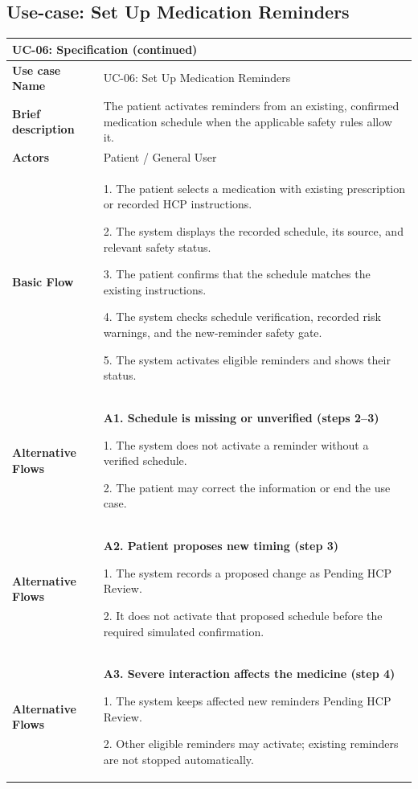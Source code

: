 \subsection{Use-case: Set Up Medication Reminders}
\label{uc:uc-06}
\begin{longtable}{|p{}|p{}|}
\hline
\endfirsthead
\multicolumn{2}{l}{\textbf{UC-06: Specification (continued)}} \\
\hline
\endhead
\textbf{Use case Name} & UC-06: Set Up Medication Reminders \\ \hline
\textbf{Brief description} & The patient activates reminders from an existing, confirmed medication schedule when the applicable safety rules allow it. \\ \hline
\textbf{Actors} & Patient / General User \\ \hline
\textbf{Basic Flow} &
1. The patient selects a medication with existing prescription or recorded HCP instructions.\par
2. The system displays the recorded schedule, its source, and relevant safety status.\par
3. The patient confirms that the schedule matches the existing instructions.\par
4. The system checks schedule verification, recorded risk warnings, and the new-reminder safety gate.\par
5. The system activates eligible reminders and shows their status.
\\ \hline
\textbf{Alternative Flows} &
\textbf{A1. Schedule is missing or unverified (steps 2--3)}\par
1. The system does not activate a reminder without a verified schedule.\par
2. The patient may correct the information or end the use case.
\\ \hline
\textbf{Alternative Flows} &
\textbf{A2. Patient proposes new timing (step 3)}\par
1. The system records a proposed change as Pending HCP Review.\par
2. It does not activate that proposed schedule before the required simulated confirmation.
\\ \hline
\textbf{Alternative Flows} &
\textbf{A3. Severe interaction affects the medicine (step 4)}\par
1. The system keeps affected new reminders Pending HCP Review.\par
2. Other eligible reminders may activate; existing reminders are not stopped automatically.

\end{longtable}
